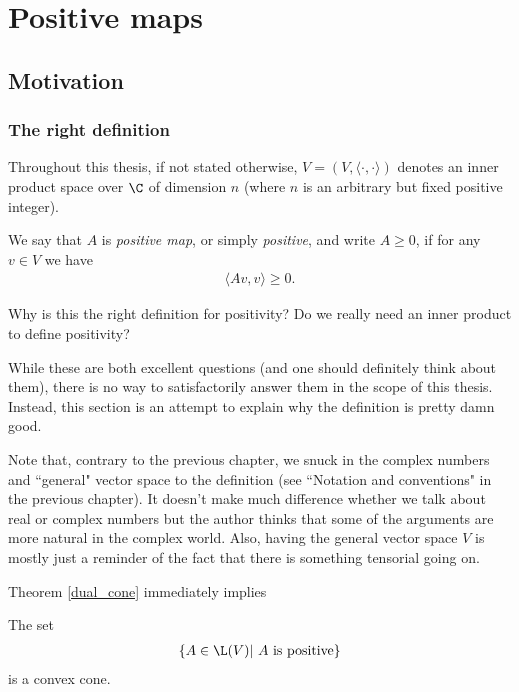 \chapter{Positive maps}

\section{Motivation}

\subsection{The right definition}

Throughout this thesis, if not stated otherwise, $V = (V, \langle \cdot, \cdot \rangle)$ denotes an inner product space over $\C$ of dimension $n$ (where $n$ is an arbitrary but fixed positive integer).

\begin{maar}
	We say that $A$ is \textit{positive map}, or simply \textit{positive}, and write $A \geq 0$, if for any $v \in V$ we have
	\begin{align*}
		\langle A v, v \rangle \geq 0.
	\end{align*}
\end{maar}

Why is this the right definition for positivity? Do we really need an inner product to define positivity?

While these are both excellent questions (and one should definitely think about them), there is no way to satisfactorily answer them in the scope of this thesis. Instead, this section is an attempt to explain why the definition is pretty damn good.

Note that, contrary to the previous chapter, we snuck in the complex numbers and ``general" vector space to the definition (see ``Notation and conventions" in the previous chapter). It doesn't make much difference whether we talk about real or complex numbers but the author thinks that some of the arguments are more natural in the complex world. Also, having the general vector space $V$ is mostly just a reminder of the fact that there is something tensorial going on.

Theorem \ref{dual_cone} immediately implies

\begin{lause}
The set
\begin{align*}
	\{A \in \L(V) | \text{ $A$ is positive} \}
\end{align*}
is a convex cone.
\end{lause}

